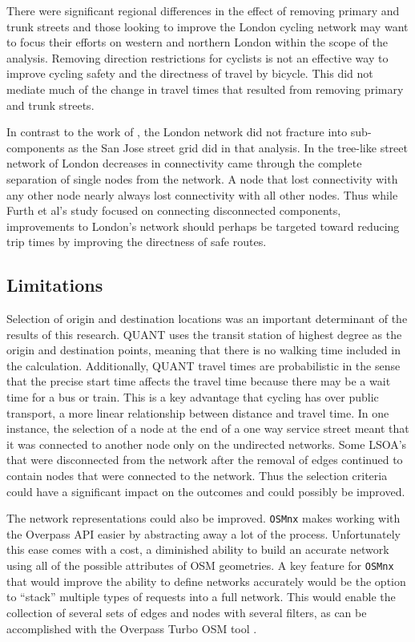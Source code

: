 There were significant regional differences in the effect of removing primary and trunk streets and those looking to improve the London cycling network may want to focus their efforts on western and northern London within the scope of the analysis. Removing direction restrictions for cyclists is not an effective way to improve cycling safety and the directness of travel by bicycle. This did not mediate much of the change in travel times that resulted from removing primary and trunk streets. 

In contrast to the work of \textcite{furth2016network}, the London network did not fracture into sub-components as the San Jose street grid did in that analysis. In the tree-like street network of London decreases in connectivity came through the complete separation of single nodes from the network. A node that lost connectivity with any other node nearly always lost connectivity with all other nodes. Thus while Furth et al's study focused on connecting disconnected components, improvements to London's network should perhaps be targeted toward reducing trip times by improving the directness of safe routes. 

\subsection{Limitations}

Selection of origin and destination locations was an important determinant of the results of this research. QUANT uses the transit station of highest degree as the origin and destination points, meaning that there is no walking time included in the calculation. Additionally, QUANT travel times are probabilistic in the sense that the precise start time affects the travel time because there may be a wait time for a bus or train. This is a key advantage that cycling has over public transport, a more linear relationship between distance and travel time. In one instance, the selection of a node at the end of a one way service street meant that it was connected to another node only on the undirected networks. Some LSOA's that were disconnected from the network after the removal of edges continued to contain nodes that were connected to the network. Thus the selection criteria could have a significant impact on the outcomes and could possibly be improved. 

The network representations could also be improved. \texttt{OSMnx} makes working with the Overpass API easier by abstracting away a lot of the process. Unfortunately this ease comes with a cost, a diminished ability to build an accurate network using all of the possible attributes of OSM geometries. A key feature for \texttt{OSMnx} that would improve the ability to define networks accurately would be the option to ``stack'' multiple types of requests into a full network. This would enable the collection of several sets of edges and nodes with several filters, as can be accomplished with the Overpass Turbo OSM tool \parencite{overpass_turbo}. 

